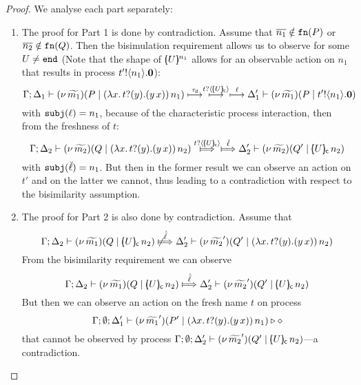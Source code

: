 \begin{proof}
We analyse each part separately:
	\begin{enumerate}[1.]
		\item	The proof for Part 1 is done by contradiction.
				Assume that $\overline{n_1} \notin \mathtt{fn}(P)$ or $\overline{n_2} \notin \mathtt{fn}(Q)$.
				Then the bisimulation requirement allows us to observe for some $U \not= \mathtt{end}$
				(Note that the shape of $[\!\!(U)\!\!]^{n_1}$ allows for an observable action on $n_1$
				that results in process $t' ! \langle n_1 \rangle . \mathbf{0}$):
				\[
					\Gamma; \Delta_1 \vdash (\nu\, \widetilde{m_1})(P \;|\; (\lambda x.\,t ? (y) . (y\, {x}))\, {n_1} )  \stackrel{\tau_{\mathsf{d}}}{\longmapsto} \stackrel{ t ? \langle [\!\!(U)\!\!]_{\mathsf{c}} \rangle  }{\longmapsto} \stackrel{\ell}{\longmapsto}  \Delta_1' \vdash (\nu\, \widetilde{m_1})(P \;|\; t' ! \langle n_1 \rangle . \mathbf{0} )
				\]
				with $\mathtt{subj}(\ell) = n_1$, because of the characteristic process interaction,
				then from the freshness of $t$:
				\[
					\horel{\Gamma}{\Delta_2}{\newsp{\widetilde{m_2}}{Q \Par \appl{(\trvalx{t})}{n_2} }}
					{ \Hby{ \bactinp{t}{\omapchar{U}}  } \Hby{\mact{\ell}} }
					{\Delta_2'}{\newsp{\widetilde{m_2}}{Q' \Par \appl{\omapchar{U}}{n_2}}}
				\]
				with $\mathtt{subj}(\breve{\ell}) = n_1$. %
				But then in the former result we can observe an action on $t'$ and on the latter
				we cannot, thus leading to a contradiction with respect to the bisimilarity assumption.

		\item	The proof for Part 2 is also done by contradiction. Assume that
				\[
					\horel{\Gamma}{\Delta_2}{\newsp{\widetilde{m_1}}{Q \Par \appl{\omapchar{U}}{n_2} }} %
					{\not\Hby{\hat{\mact{\ell}}}}
					{\Delta_2'}{\newsp{\widetilde{m_2}'}{Q' \Par \appl{(\trvalx{t})}{n_2} }} %
				\]
				From the bisimilarity requirement we can observe
				\[
					\horel{\Gamma}{\Delta_2}{\newsp{\widetilde{m_1}}{Q \Par \appl{\omapchar{U}}{n_2} }} %
					{\Hby{\hat{\mact{\ell}}}}
					{\Delta_2'}{\newsp{\widetilde{m_2}'}{Q' \Par \appl{\omapchar{U}}{n_2} }} %
				\]
				But then we can observe an action on the fresh name $t$ on process
				\[
					\Gamma; \emptyset; \Delta_1' \vdash (\nu\, \widetilde{m_1}')(P' \;|\; (\lambda x.\,t ? (y) . (y\, {x}))\, {n_1} ) \triangleright \diamond
				\]
				that cannot be observed by process
				$
					\Gamma; \emptyset; \Delta_2' \vdash (\nu\, \widetilde{m_2}')(Q' \;|\; [\!\!(U)\!\!]_{\mathsf{c}}\, {n_2} )
				$---a contradiction.


\end{enumerate}
\end{proof}
